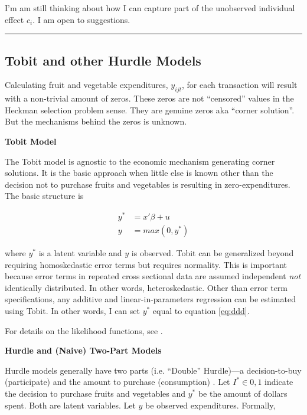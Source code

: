 \documentclass[12pt,letterpaperpaper,]{book}
\begin{document}
I'm am still thinking about how I can capture part of the unobserved
individual effect \(c_i\). I am open to suggestions.

\begin{center}\rule{0.5\linewidth}{\linethickness}\end{center}

\subsection*{Tobit and other Hurdle
Models}\label{tobit-and-other-hurdle-models}

Calculating fruit and vegetable expenditures, \(y_{ijt}\), for each
transaction will result with a non-trivial amount of zeros. These zeros
are not ``censored'' values in the Heckman selection problem sense. They
are genuine zeros aka ``corner solution''. But the mechanisms behind the
zeros is unknown.

\textbf{Tobit Model}

The Tobit model is agnostic to the economic mechanism generating corner
solutions. It is the basic approach when little else is known other than
the decision not to purchase fruits and vegetables is resulting in
zero-expenditures. The basic structure is

\[
\begin{aligned}
y^* &= x'\beta + u \\
y &= max(0, y^*)
\end{aligned}
\]

where \(y^*\) is a latent variable and \(y\) is observed. Tobit can be
generalized beyond requiring homoskedastic error terms but requires
normality. This is important because error terms in repeated cross
sectional data are assumed independent \emph{not} identically
distributed. In other words, heteroskedastic. Other than error term
specifications, any additive and linear-in-parameters regression can be
estimated using Tobit. In other words, I can set \(y^*\) equal to
equation \eqref{eq:ddd}.

For details on the likelihood functions, see \citet{amemiya_tobit_1984}.

\textbf{Hurdle and (Naive) Two-Part Models}

Hurdle models generally have two parts (i.e. ``Double'' Hurdle)---a
decision-to-buy (participate) and the amount to purchase (consumption)
\citep{jones_double-hurdle_1989}. Let \(I^* \in {0,1}\) indicate the
decision to purchase fruits and vegetables and \(y^*\) be the amount of
dollars spent. Both are latent variables. Let \(y\) be observed
expenditures. Formally,
\end{document}
